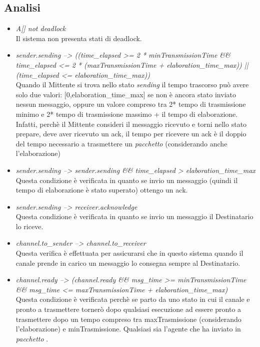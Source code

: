 \documentclass[a4paper]{article}
\newcommand{\pacchetto}{\textit{pacchetto }}
\begin{document}
\subsection{Analisi}
\begin{itemize}
	\item \textit{A[] not deadlock}\\
		Il sistema non presenta stati di deadlock.
	\item \textit{sender.sending --> ((time\_elapsed >= 2 * minTransmissionTime \&\& time\_elapsed <= 2 * (maxTransmissionTime + elaboration\_time\_max)) ||(time\_elapsed <= elaboration\_time\_max))}\\
		Quando il Mittente si trova nello stato \textit{sending} il tempo trascorso può avere solo due valori: [0,elaboration\_time\_max] se non è ancora stato inviato nessun messaggio, oppure un valore compreso tra 2* tempo di trasmissione minimo e 2* tempo di trasmissione massimo + il tempo di elaborazione. Infatti, perchè il Mittente consideri il messaggio ricevuto e torni nello stato prepare, deve aver ricevuto un ack, il tempo per ricevere un ack è il doppio del tempo necessario a trasmettere un \pacchetto (considerando anche l'elaborazione)
	\item \textit{sender.sending --> sender.sending \&\& time\_elapsed > elaboration\_time\_max}\\
		Questa condizione è verificata in quanto se invio un messaggio (quindi il tempo di elaborazione è stato superato) ottengo un ack. 
	\item \textit{sender.sending --> receiver.acknowledge}\\
		Questa condizione è verificata in quanto se invio un messaggio il Destinatario lo riceve.
	\item \textit{channel.to\_sender --> channel.to\_receiver}\\
		Questa verifica è effettuata per assicurarsi che in questo sistema quando il canale prende in carico un messaggio lo consegna sempre al Destinatario.
	\item \textit{channel.ready --> (channel.ready \&\& msg\_time >= minTransmissionTime \&\& msg\_time <= maxTransmissionTime + elaboration\_time\_max)}\\
		Questa condizione è verificata perchè se parto da uno stato in cui il canale e pronto a trasmettere tornerò dopo qualsiasi esecuzione ad essere pronto a trasmettere dopo un tempo compreso tra maxTrasmissione (considerando l'elaborazione) e minTrasmissione.
		Qualsiasi sia l'agente che ha inviato in \pacchetto.
\end{itemize}
\end{document}
